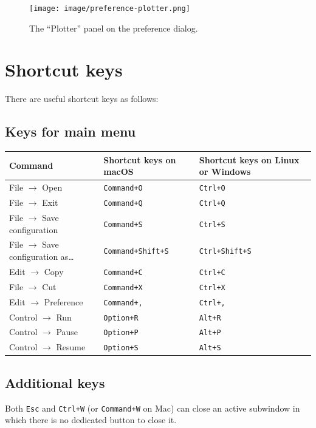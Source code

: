 \documentclass[a4paper,10pt]{report}
\begin{document}
\begin{figure}[htbp]
\centering
\texttt{[image: image/preference-plotter.png]}
\caption{\label{fig:orgb53f385}The ``Plotter'' panel on the preference dialog.}
\end{figure}

\section{Shortcut keys}
\label{sec:orgad3c7e4}
There are useful shortcut keys as follows:

\subsection{Keys for main menu}
\label{sec:orge982ca8}
\begin{center}
\begin{tabular}{l||l|l}
Command & Shortcut keys on macOS & Shortcut keys on Linux or Windows\\
\hline
File \(\to\) Open & \texttt{Command+O} & \texttt{Ctrl+O}\\
File \(\to\) Exit & \texttt{Command+Q} & \texttt{Ctrl+Q}\\
File \(\to\) Save configuration & \texttt{Command+S} & \texttt{Ctrl+S}\\
File \(\to\) Save configuration as\ldots{} & \texttt{Command+Shift+S} & \texttt{Ctrl+Shift+S}\\
Edit \(\to\) Copy & \texttt{Command+C} & \texttt{Ctrl+C}\\
File \(\to\) Cut & \texttt{Command+X} & \texttt{Ctrl+X}\\
Edit \(\to\) Preference & \texttt{Command+,} & \texttt{Ctrl+,}\\
Control \(\to\) Run & \texttt{Option+R} & \texttt{Alt+R}\\
Control \(\to\) Pause & \texttt{Option+P} & \texttt{Alt+P}\\
Control \(\to\) Resume & \texttt{Option+S} & \texttt{Alt+S}\\
\end{tabular}
\end{center}

\subsection{Additional keys}
\label{sec:org49c5a65}
Both \texttt{Esc} and \texttt{Ctrl+W} (or \texttt{Command+W} on Mac) can close an active
subwindow in which there is no dedicated button to close it.
\end{document}
